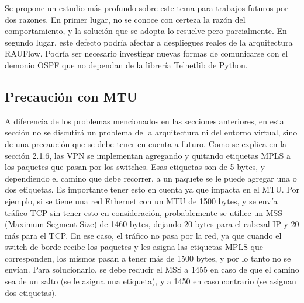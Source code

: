 Se propone un estudio más profundo sobre este tema para trabajos futuros por dos razones. En primer lugar, no se conoce con certeza la razón del comportamiento, y la solución que se adopta lo resuelve pero parcialmente. En segundo lugar, este defecto podría afectar a despliegues reales de la arquitectura RAUFlow. Podría ser necesario investigar nuevas formas de comunicarse con el demonio OSPF que no dependan de la librería Telnetlib de Python.

\subsection{Precaución con MTU}
A diferencia de los problemas mencionados en las secciones anteriores, en esta sección no se discutirá un problema de la arquitectura ni del entorno virtual, sino de una precaución que se debe tener en cuenta a futuro. Como se explica en la sección 2.1.6, las VPN se implementan agregando y quitando etiquetas MPLS a los paquetes que pasan por los switches. Esas etiquetas son de 5 bytes, y dependiendo el camino que debe recorrer, a un paquete se le puede agregar una o dos etiquetas. Es importante tener esto en cuenta ya que impacta en el MTU. Por ejemplo, si se tiene una red Ethernet con un MTU de 1500 bytes, y se envía tráfico TCP sin tener esto en consideración, probablemente se utilice un MSS (Maximum Segment Size) de 1460 bytes, dejando 20 bytes para el cabezal IP y 20 más para el TCP. En ese caso, el tráfico no pasa por la red, ya que cuando el switch de borde recibe los paquetes y les asigna las etiquetas MPLS que corresponden, los mismos pasan a tener más de 1500 bytes, y por lo tanto no se envían. Para solucionarlo, se debe reducir el MSS a 1455 en caso de que el camino sea de un salto (se le asigna una etiqueta), y a 1450 en caso contrario (se asignan dos etiquetas).
